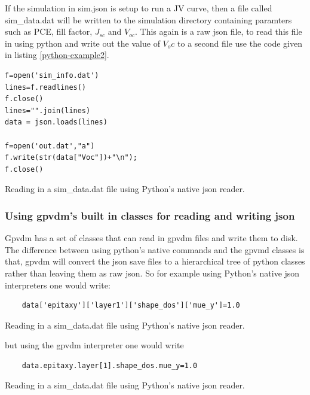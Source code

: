 If the simulation in sim.json is setup to run a JV curve, then a file called sim\_data.dat will be written to the simulation directory containing paramters such as PCE, fill factor, $J_{sc}$ and $V_{oc}$.  This again is a raw json file, to read this file in using python and write out the value of $V_oc$ to a second file use the code given in listing \ref{python-example2}.

\begin{listing}
\begin{verbatim}
f=open('sim_info.dat')
lines=f.readlines()
f.close()
lines="".join(lines)
data = json.loads(lines)

f=open('out.dat',"a")
f.write(str(data["Voc"])+"\n");
f.close()

\end{verbatim}
\caption{Reading in a sim\_data.dat file using Python's native json reader.} 
\label{python-example2}
\end{listing}



\subsubsection{Using gpvdm's built in classes for reading and writing json}
Gpvdm has a set of classes that can read in gpvdm files and write them to disk. The difference between using python's native commands and the gpvmd classes is that, gpvdm will convert the json save files to a hierarchical tree of python classes rather than leaving them as raw json. So for example using Python's native json interpreters one would write:

 
\begin{listing}
\begin{verbatim}
	data['epitaxy']['layer1']['shape_dos']['mue_y']=1.0
\end{verbatim}
\caption{Reading in a sim\_data.dat file using Python's native json reader.} 
\label{python-example3}
\end{listing}

but using the gpvdm interpreter one would write

\begin{listing}
\begin{verbatim}
	data.epitaxy.layer[1].shape_dos.mue_y=1.0
\end{verbatim}
\caption{Reading in a sim\_data.dat file using Python's native json reader.} 
\label{python-example4}
\end{listing}

